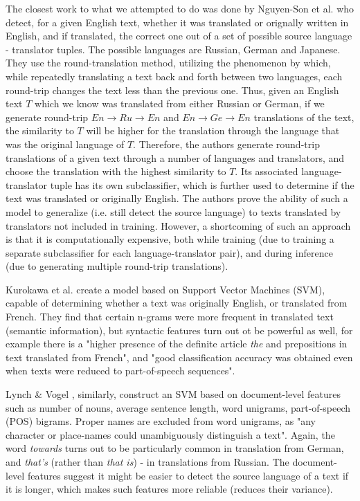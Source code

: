 \documentclass[twocolumn]{article}
\begin{document}
The closest work to what we attempted to do was done by Nguyen-Son et al. \cite{roundtrip} who detect, for a given English text, whether it was translated or orignally written in English, and if translated, the correct one out of a set of possible source language - translator tuples. The possible languages are Russian, German and Japanese. They use the round-translation method, utilizing the phenomenon by which, while repeatedly translating a text back and forth between two languages, each round-trip changes the text less than the previous one. Thus, given an English text $T$ which we know was translated from either Russian or German, if we generate round-trip $En \rightarrow Ru \rightarrow En$ and $En \rightarrow Ge \rightarrow En$ translations of the text, the similarity to $T$ will be higher for the translation through the language that was the original language of $T$. Therefore, the authors generate round-trip translations of a given text through a number of languages and translators, and choose the translation with the highest similarity to $T$. Its associated language-translator tuple has its own subclassifier, which is further used to determine if the text was translated or originally English. The authors prove the ability of such a model to generalize (i.e. still detect the source language) to texts translated by translators not included in training. However, a shortcoming of such an approach is that it is computationally expensive, both while training (due to training a separate subclassifier for each language-translator pair), and during inference (due to generating multiple round-trip translations).

Kurokawa et al. \cite{canada} create a model based on Support Vector Machines (SVM), capable of determining whether a text was originally English, or translated from French. They find that certain n-grams were more frequent in translated text (semantic information), but syntactic features turn out ot be powerful as well, for example there is a "higher presence of the definite article \emph{the} and prepositions in text translated from French", and "good classification accuracy was obtained even when texts were reduced to part-of-speech sequences".

Lynch \& Vogel \cite{literary}, similarly, construct an SVM based on document-level features such as number of nouns, average sentence length, word unigrams, part-of-speech (POS) bigrams. Proper names are excluded from word unigrams, as "any character or place-names could unambiguously distinguish a text". Again, the word \emph{towards} turns out to be particularly common in translation from German, and \emph{that's} (rather than \emph{that is}) - in translations from Russian. The document-level features suggest it might be easier to detect the source language of a text if it is longer, which makes such features more reliable (reduces their variance).
\end{document}
